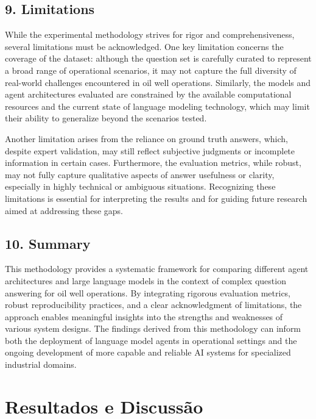         \subsection{9. Limitations}

            While the experimental methodology strives for rigor and comprehensiveness, several limitations must be acknowledged. One key limitation concerns the coverage of the dataset: although the question set is carefully curated to represent a broad range of operational scenarios, it may not capture the full diversity of real-world challenges encountered in oil well operations. Similarly, the models and agent architectures evaluated are constrained by the available computational resources and the current state of language modeling technology, which may limit their ability to generalize beyond the scenarios tested.

            Another limitation arises from the reliance on ground truth answers, which, despite expert validation, may still reflect subjective judgments or incomplete information in certain cases. Furthermore, the evaluation metrics, while robust, may not fully capture qualitative aspects of answer usefulness or clarity, especially in highly technical or ambiguous situations. Recognizing these limitations is essential for interpreting the results and for guiding future research aimed at addressing these gaps.

        \subsection{10. Summary}

            This methodology provides a systematic framework for comparing different agent architectures and large language models in the context of complex question answering for oil well operations. By integrating rigorous evaluation metrics, robust reproducibility practices, and a clear acknowledgment of limitations, the approach enables meaningful insights into the strengths and weaknesses of various system designs. The findings derived from this methodology can inform both the deployment of language model agents in operational settings and the ongoing development of more capable and reliable AI systems for specialized industrial domains.


    \section{Resultados e Discussão}

